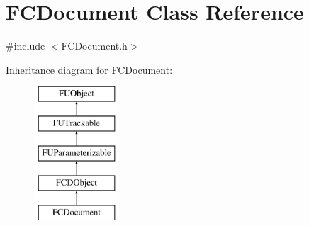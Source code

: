 \hypertarget{classFCDocument}{
\section{FCDocument Class Reference}
\label{classFCDocument}
}


{\ttfamily \#include $<$FCDocument.h$>$}

Inheritance diagram for FCDocument:\begin{figure}[H]
\begin{center}
\leavevmode
\includegraphics[height=5.000000cm]{classFCDocument}
\end{center}
\end{figure}
